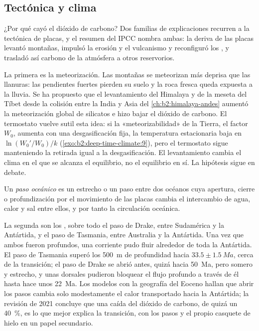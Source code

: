 \subsection*{Tectónica y clima}

¿Por qué cayó el dióxido de carbono? Dos familias de explicaciones recurren a la tectónica de placas, y el resumen del
IPCC nombra ambas: la deriva de las placas levantó montañas, impulsó la erosión y el vulcanismo y
reconfiguró los , y trasladó así carbono de la atmósfera a otros reservorios.

La primera es la meteorización. Las montañas se meteorizan más deprisa que las llanuras: las pendientes fuertes pierden su
suelo y la roca fresca queda expuesta a la lluvia. Se ha propuesto que el levantamiento del Himalaya y de la meseta del Tíbet desde
la colisión entre la India y Asia del \cref{ch:b2:himalaya-andes} aumentó la meteorización global de
silicatos e hizo bajar el dióxido de carbono. El termostato vuelve sutil esta idea: si la
«meteorizabilidad» de la Tierra, el factor $W_0$, aumenta con una desgasificación fija, la temperatura estacionaria
baja en $\ln(W_0'/W_0)/k$ (\cref{exo:b2:deep-time-climate:9}), pero el termostato sigue manteniendo la
retirada igual a la desgasificación. El levantamiento cambia el clima en el que se alcanza el equilibrio, no el
equilibrio en sí. La hipótesis sigue en debate.

\begin{definition}\label{def:b2:deep-time-climate:gateway}
Un \emph{paso oceánico} es un estrecho o un paso entre dos océanos cuya apertura,
cierre o profundización por el movimiento de las placas cambia el intercambio de agua, calor y sal entre ellos, y
por tanto la circulación oceánica.
\end{definition}

La segunda son los , sobre todo el paso de Drake, entre Sudamérica y la Antártida,
y el paso de Tasmania, entre Australia y la Antártida. Una vez que ambos fueron profundos, una corriente pudo fluir
alrededor de toda la Antártida. El paso de Tasmania superó los \qty{500}{m} de profundidad hacia $33.5 \pm
\qty{1.5}{Ma}$, cerca de la transición; el paso de Drake se abrió antes, quizá hacia \qty{50}{Ma},
pero somero y estrecho, y unas dorsales pudieron bloquear el flujo profundo a través de él hasta hace unos \qty{22}{Ma}. Los modelos con
la geografía del Eoceno hallan que abrir los pasos cambia solo modestamente el calor transportado hacia la
Antártida; la revisión de 2021 concluye que una caída del dióxido de carbono, de quizá un
\qty{40}{\percent}, es lo que mejor explica la transición, con los pasos y el propio casquete de hielo en un
papel secundario.


